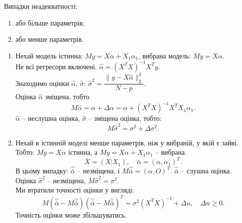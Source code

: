 Випадки неадекватності:
\begin{enumerate}
	\item або більше параметрів;
	\item або менше параметрів.
\end{enumerate}
\begin{enumerate}
	\item Нехай модель істинна: $My = X\alpha+X_1\alpha_1$, вибрана модель: $My = X\alpha$. \\

	Не всі регресори включені. $\widehat{\alpha} = (X^TX)^{-1}X^Ty$. \\

	Знаходимо оцінки $\widehat{\alpha}$, $\widehat{\sigma}$: $\widehat{\sigma}^2 = \dfrac{\|y-X\widehat{\alpha}\|_2^2}{N-p}$. \\

	Оцінка $\widehat{\alpha}$ зміщена, тобто \[ M \widehat{\alpha} = \alpha + \Delta \alpha = \alpha + (X^TX)^{-1}X^TX_1\alpha_1. \]
	$\widehat{\alpha}$ -- неслушна оцінка, $\widehat{\sigma}$ -- зміщена оцінка, тобто: \[ M\widehat{\sigma}^2 = \sigma^2 + \Delta\sigma^2.\]
	\item Нехай в істинній моделі менше параметрів, ніж у вибраній, у якій є зайві. Тобто: $My = X\alpha$ істинна, а $My = X\alpha + X_1\alpha_1$ -- вибрана.
	\[ \bar{X} = (X\vdots X_1), \quad \bar{\alpha} = (\alpha, \alpha_1)^T. \]
	В цьому випадку: $\widehat{\bar{\alpha}}$ -- незміщена, і $M\widehat{\bar{\alpha}}=(\alpha,O)^T$. $\widehat{\bar{\alpha}}$ -- слушна оцінка. \\

	Оцінка $\widehat{\sigma}^2$ -- незміщена, $M\widehat{\sigma}^2 = \sigma^2$. \\

	Ми втратили точності оцінки у вигляді: \[ M(\widehat{\bar{\alpha}}-M\widehat{\bar{\alpha}})(\widehat{\bar{\alpha}}-M\widehat{\bar{\alpha}})^T =\sigma^2 (X^TX)^{-1} + \Delta u, \quad \Delta u \ge 0. \]
  	Точність оцінки може збільшуватись.
\end{enumerate}